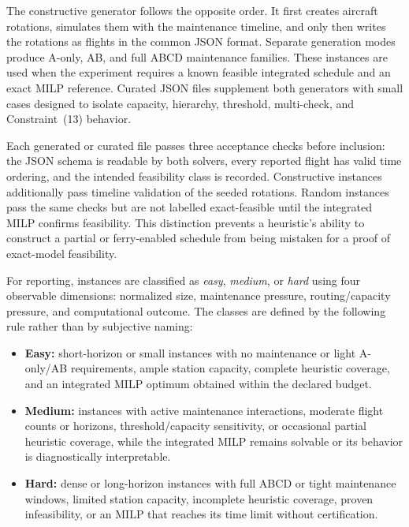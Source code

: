 The constructive generator follows the opposite order. It first creates
aircraft rotations, simulates them with the maintenance timeline, and only then
writes the rotations as flights in the common JSON format. Separate generation
modes produce A-only, AB, and full ABCD maintenance families. These instances
are used when the experiment requires a known feasible integrated schedule and
an exact MILP reference. Curated JSON files supplement both generators with
small cases designed to isolate capacity, hierarchy, threshold, multi-check,
and Constraint~(13) behavior.

Each generated or curated file passes three acceptance checks before inclusion:
the JSON schema is readable by both solvers, every reported flight has valid
time ordering, and the intended feasibility class is recorded. Constructive
instances additionally pass timeline validation of the seeded rotations.
Random instances pass the same checks but are not labelled exact-feasible until
the integrated MILP confirms feasibility. This distinction prevents a
heuristic's ability to construct a partial or ferry-enabled schedule from being
mistaken for a proof of exact-model feasibility.

For reporting, instances are classified as \emph{easy}, \emph{medium}, or
\emph{hard} using four observable dimensions: normalized size, maintenance
pressure, routing/capacity pressure, and computational outcome. The classes are
defined by the following rule rather than by subjective naming:

\begin{itemize}
  \item \textbf{Easy:} short-horizon or small instances with no maintenance
  or light A-only/AB requirements, ample station capacity, complete heuristic
  coverage, and an integrated MILP optimum obtained within the declared
  budget.
  \item \textbf{Medium:} instances with active maintenance interactions,
  moderate flight counts or horizons, threshold/capacity sensitivity, or
  occasional partial heuristic coverage, while the integrated MILP remains
  solvable or its behavior is diagnostically interpretable.
  \item \textbf{Hard:} dense or long-horizon instances with full ABCD or tight
  maintenance windows, limited station capacity, incomplete heuristic
  coverage, proven infeasibility, or an MILP that reaches its time limit
  without certification.
\end{itemize}

